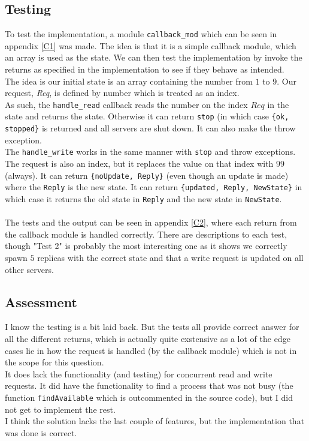 \documentclass[a4paper]{article}
\begin{document}
\subsection{Testing}
To test the implementation, a module \texttt{callback\_mod} which can be seen in appendix \ref{C1} was made. The idea is that it is a simple callback module, which an array is used as the state. We can then test the implementation by invoke the returns as specified in the implementation to see if they behave as intended. \\
The idea is our initial state is an array containing the number from $1$ to $9$. Our request, \textit{Req}, is defined by number which is treated as an index. \\
As such, the \texttt{handle\_read} callback reads the number on the index $Req$ in the state and returns the state. Otherwise it can return \texttt{stop} (in which case \texttt{\{ok, stopped\}} is returned and all servers are shut down. It can also make the throw exception. \\
The \texttt{handle\_write} works in the same manner with \texttt{stop} and throw exceptions. The request is also an index, but it replaces the value on that index with $99$ (always). It can return \texttt{\{noUpdate, Reply\}} (even though an update is made) where the \texttt{Reply} is the new state. It can return \texttt{\{updated, Reply, NewState\}} in which case it returns the old state in \texttt{Reply} and the new state in \texttt{NewState}. \\
\\
The tests and the output can be seen in appendix \ref{C2}, where each return from the callback module is handled correctly. There are descriptions to each test, though "Test 2" is probably the most interesting one as it shows we correctly spawn $5$ replicas with the correct state and that a write request is updated on all other servers.

\subsection{Assessment}
I know the testing is a bit laid back. But the tests all provide correct answer for all the different returns, which is actually quite exstensive as a lot of the edge cases lie in how the request is handled (by the callback module) which is not in the scope for this question. \\
It does lack the functionality (and testing) for concurrent read and write requests. It did have the functionality to find a process that was not busy (the function \texttt{findAvailable} which is outcommented in the source code), but I did not get to implement the rest. \\
I think the solution lacks the last couple of features, but the implementation that was done is correct.
\end{document}
